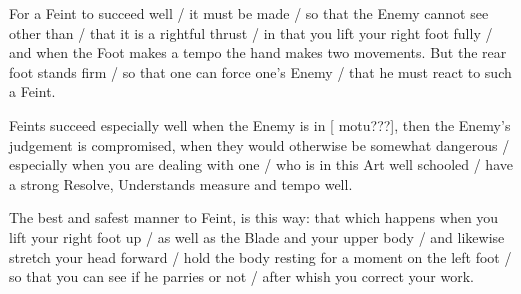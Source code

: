 
For a Feint to succeed well / it must be made / so that the Enemy
cannot see other than / that it is a rightful thrust / in that you
lift your right foot fully / and when the Foot makes a tempo the hand
makes two movements. But the rear foot stands firm / so that one can
force one's Enemy / that he must react to such a Feint.


Feints succeed especially well when the Enemy is in [ motu???], then
the Enemy's judgement is compromised, when they would otherwise be
somewhat dangerous / especially when you are dealing with one / who is
in this Art well schooled / have a strong Resolve, Understands measure
and tempo well.


The best and safest manner to Feint, is this way: that which happens
when you lift your right foot up / as well as the Blade and your upper
body / and likewise stretch your head forward / hold the body resting for a
moment on the left foot / so that you can see if he parries or not /
after whish you correct your work.